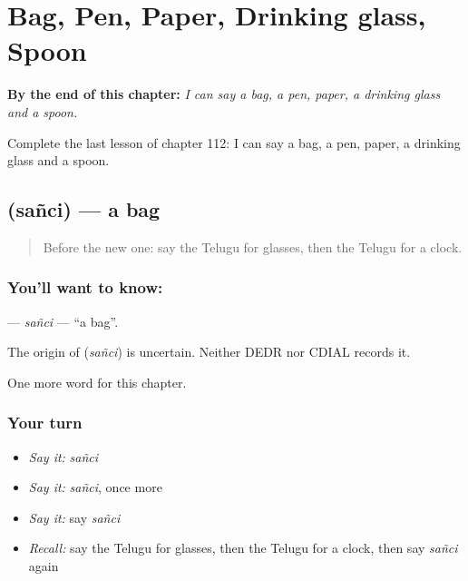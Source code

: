
\chapter{Bag, Pen, Paper, Drinking glass, Spoon}
\label{ch:te-bag-pen-paper-drinking-glass-spoon}

\begin{chapteropening}
\textbf{By the end of this chapter:} \emph{I can say a bag, a pen, paper, a drinking glass and a spoon.}

Complete the last lesson of chapter 112: I can say a bag, a pen, paper, a drinking glass and a spoon.
\end{chapteropening}

\section[\texorpdfstring{\te{సంచి} (sañci)}{సంచి (sañci)}]{ (sañci) — a bag}

\label{lesson:TE-C112-sanci}



\begin{quote}
Before the new one: say the Telugu for glasses, then the Telugu for a clock.
\end{quote}

\subsection*{You'll want to know: }
\textbf{} — \emph{sañci} — \textquotedblleft{}a bag\textquotedblright{}.

\begin{cousinweb}
The origin of \textbf{} (\emph{sañci}) is uncertain. Neither DEDR nor CDIAL records it.
\end{cousinweb}

\begin{grammarlens}[title={What you've built}]
One more word for this chapter.
\end{grammarlens}

\subsection*{Your turn}
\begin{itemize}
\raggedright
  \item \emph{Say it:} \emph{sañci}
  \item \emph{Say it:} \emph{sañci}, once more
  \item \emph{Say it:} say \emph{sañci}
  \item \emph{Recall:} say the Telugu for glasses, then the Telugu for a clock, then say \emph{sañci} again
\end{itemize}

